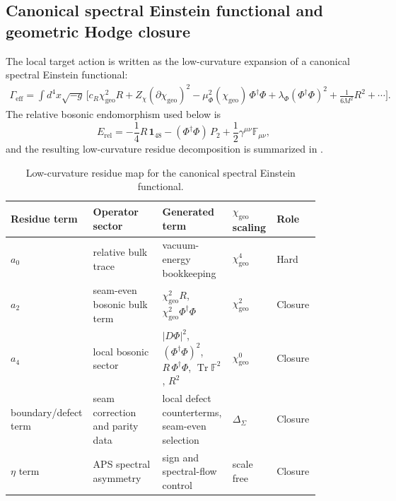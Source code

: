 \documentclass[11pt,a4paper]{article}
\theoremstyle{definition}
\theoremstyle{remark}
\DeclareMathOperator{\tr}{Tr}
\newcommand{\Seam}{\Sigma}
\newcommand{\Gammaeff}{\Gamma_{\mathrm{eff}}}
\newcommand{\chigeo}{\chi_{\mathrm{geo}}}
\begin{document}
\subsection{Canonical spectral Einstein functional and geometric Hodge closure}

The local target action is written as the low-curvature expansion of a canonical spectral
Einstein functional:
\begin{equation}
\label{eq:chi-effective-action}
\begin{aligned}
\Gammaeff
=
\int d^4x\sqrt{-g}\,
\Big[
c_R\chigeo^2R
+Z_\chi(\partial\chigeo)^2
-\mu_\Phi^2(\chigeo)\,\Phi^\dagger\Phi
+\lambda_\Phi(\Phi^\dagger\Phi)^2
+\frac{1}{6M^2}R^2
+\cdots
\Big].
\end{aligned}
\end{equation}
The relative bosonic endomorphism used below is
\begin{equation}
\label{eq:relative-bosonic-endomorphism}
E_{\mathrm{rel}}
=
-\frac14 R\,\mathbf 1_{48}
-
(\Phi^\dagger\Phi)\,P_2
+
\frac12\gamma^{\mu\nu}\mathbb F_{\mu\nu},
\end{equation}
and the resulting low-curvature residue decomposition is summarized in
.

\begin{table}[t]
\centering
\scriptsize
\setlength{\tabcolsep}{3pt}
\begin{tabular}{@{}>{\raggedright\arraybackslash}p{0.15\linewidth}>{\raggedright\arraybackslash}p{0.22\linewidth}>{\raggedright\arraybackslash}p{0.22\linewidth}>{\raggedright\arraybackslash}p{0.14\linewidth}>{\raggedright\arraybackslash}p{0.14\linewidth}@{}}
\toprule
Residue term & Operator sector & Generated term & $\chigeo$ scaling & Role \\
\midrule
$a_0$ & relative bulk trace & vacuum-energy bookkeeping & $\chigeo^4$ & Hard \\
$a_2$ & seam-even bosonic bulk term & $\chigeo^2R$, $\chigeo^2\Phi^\dagger\Phi$ & $\chigeo^2$ & Closure \\
$a_4$ & local bosonic sector & $|D\Phi|^2$, $(\Phi^\dagger\Phi)^2$, $R\,\Phi^\dagger\Phi$, $\tr\mathbb F^2$, $R^2$ & $\chigeo^0$ & Closure \\
boundary/defect term & seam correction and parity data & local defect counterterms, seam-even selection & $\Delta_{\Seam}$ & Closure \\
$\eta$ term & APS spectral asymmetry & sign and spectral-flow control & scale free & Closure \\
\bottomrule
\end{tabular}
\caption{Low-curvature residue map for the canonical spectral Einstein functional.}
\label{tab:heat-kernel-map}
\end{table}
\end{document}

